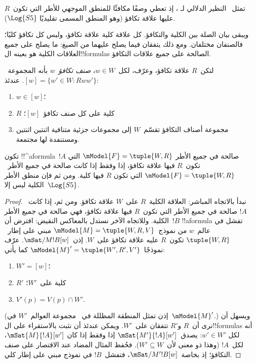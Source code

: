 \documentclass[../../../include/open-logic-section]{subfiles}
\begin{document}
تمثل~ النظير الدلالي لـ
، إذ تعطي وصفًا مكافئًا للمنطق الموجهي
للأطر التي تكون~$R$ عليها علاقة تكافؤ (وهو المنطق المسمى تقليديًا
$\Log{S5}$).

ويبقى بيان الصلة بين الكلية والتكافؤ. كل علاقة كلية علاقة تكافؤ،
وليس كل تكافؤ كليًا؛ فالصنفان مختلفان. ومع ذلك يتفقان فيما يصلح
عليهما من الصيغ: ما يصلح على جميع العلاقات الكلية هو بعينه
ال!!{formula}s الصالحة على جميع علاقات التكافؤ.

\begin{prop}
  لتكن~$R$ علاقة تكافؤ، وعرّف، لكل~$w \in W$، \emph{صنف تكافؤ}~$w$
  بأنه المجموعة~$[w] = \{w'\in W : Rww'\}$. عندئذ:
  \begin{enumerate}
  \item $w \in [w]$؛
  \item $R$ كلية على كل صنف تكافؤ~$[w]$؛
  \item مجموعة أصناف التكافؤ تقسّم~$W$ إلى مجموعات جزئية متنافية
    اثنتين اثنتين ومستنفدة لها مجتمعة.
  \end{enumerate}
\end{prop}

\begin{prop}
  تكون !!^a{formula}~$!A$ صالحة في جميع الأطر
  $\mModel{F} =\tuple{W,R}$ التي تكون~$R$ فيها علاقة تكافؤ، إذا وفقط
  إذا كانت صالحة في جميع الأطر~$\mModel{F} =\tuple{W,R}$ التي تكون
  $R$ فيها كلية. ومن ثم فإن منطق الأطر الكلية ليس إلا~$\Log{S5}$.
\end{prop}

\begin{proof}
  نبدأ بالاتجاه المباشر: العلاقة الكلية~$R$ على~$W$ علاقة تكافؤ.
  ومن ثم، إذا كانت~$!A$ صالحة في جميع الأطر التي تكون~$R$ فيها علاقة
  تكافؤ، فهي صالحة في جميع الأطر الكلية. وللاتجاه الآخر نستدل
  بالمعاكس النقيض: افترض أن~$!B$ !!a{formula} تفشل في عالم~$w$ من
  نموذج~$\mModel{M} = \tuple{W, R, V}$ مبني على إطار~$\tuple{W,R}$
  تكون~$R$ عليه علاقة تكافؤ على~$W$. إذن~$\mSat/{M}{!B}[w]$. عرّف
  نموذجًا~$\mModel{M}' = \tuple{W', R', V'}$ كما يأتي:
  \begin{enumerate}
  \item $W' = [w]$؛
  \item $R'$ كلية على~$W'$؛
  \item $V'(p) = V(p) \cap W'$.
  \end{enumerate}
  (إذن تمثل المنطقة المظللة في~ مجموعة
  العوالم~$W'$ في~$\mModel{M}'$.) ويسهل أن نرى أن~$R$ و$R'$ تتفقان
  على~$W'$. ويمكن عندئذ أن نثبت بالاستقراء على ال!!{formula}s أنه لكل
  $w' \in W'$: يصدق~$\mSat{M'}{!A}[w']$ إذا وفقط إذا كان
  $\mSat{M}{!A}[w']$، لكل~$!A$ (وهذا ذو معنى لأن~$W' \subseteq W$).
  فحُفظ المثال المضاد عند الاقتصار على صنف التكافؤ؛ إذ بخاصة~$\mSat/{M'}{!B}[w]$، فتفشل~$!B$ في نموذج مبني على إطار كلي.
\end{proof}
\end{document}
